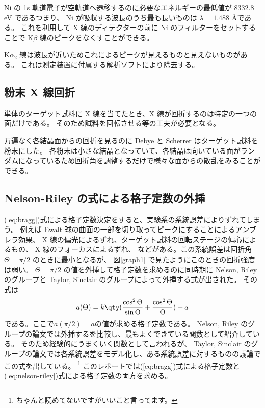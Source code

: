 \documentclass[11pt,dvipdfmx,a4paper]{jsarticle}
\begin{document}
Ni の 1s 軌道電子が空軌道へ遷移するのに必要なエネルギーの最低値が 8332.8 eV であるつまり、
Ni が吸収する波長のうち最も長いものは \(\lambda = 1.488\) \AA である。
これを利用して X 線のディテクターの前に Ni のフィルターをセットすることで K\(\beta\) 線のピークをなくすことができる。

K\(\alpha_2\) 線は波長が近いためこれによるピークが見えるものと見えないものがある。
これは測定装置に付属する解析ソフトにより除去する。

\subsection{粉末 X 線回折}
単体のターゲット試料に X 線を当てたとき、X 線が回折するのは特定の一つの面だけである。
そのため試料を回転させる等の工夫が必要となる。

万遍なく各結晶面からの回折を見るのに Debye と Scherrer はターゲット試料を粉末にした。
各粉末は小さな結晶となっていて、各結晶は向いている面がランダムになっているため回折角を調整するだけで様々な面からの散乱をみることができる。


\subsection{Nelson-Riley の式による格子定数の外挿}
(\ref{eq:bragg})式による格子定数決定をすると、実験系の系統誤差によりずれてしまう。
例えば Ewalt 球の曲面の一部を切り取ってピークにすることによるアンブレラ効果、
X 線の偏光によるずれ、ターゲット試料の回転ステージの偏心によるもの、
X 線のフォーカスによるずれ、
などがある。この系統誤差は回折角 \(\Theta = \pi/2\) のときに最小となるが、
図\ref{graph1} で見たようにこのときの回折強度は弱い。
\(\Theta = \pi/2\) の値を外挿して格子定数を求めるのに同時期に Nelson, Riley のグループと
Taylor, Sinclair のグループによって外挿する式が出された。\cite{Nelson_1945}\cite{Taylor_1945}
その式は
\begin{align}
	a(\Theta) = k\qty(\frac{\cos^2\Theta}{\sin\Theta}+\frac{\cos^2\Theta}{\Theta}) + a \label{eq:nelson-riley}
\end{align}
である。ここで\(a(\pi/2)=a\)の値が求める格子定数である。
Nelson, Riley のグループの論文では外挿するを比較し、最もよくできている関数として紹介している。
そのため経験的にうまくいく関数として言われるが、
Taylor, Sinclair のグループの論文では各系統誤差をモデル化し、ある系統誤差に対するものの議論でこの式を出している。
\footnote{ちゃんと読めてないですがいいこと言ってます。}
このレポートでは(\ref{eq:bragg})式による格子定数と(\ref{eq:nelson-riley})式による格子定数の両方を求める。
\end{document}
